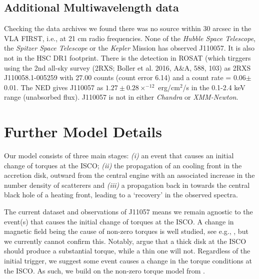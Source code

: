 \documentclass[11pt,a4paper]{article}
\begin{document}
\subsection*{Additional Multiwavelength data}
Checking the data archives we found there was no source within 30
arcsec in the VLA FIRST, i.e., at 21 cm radio frequencies.  None of
the {\it Hubble Space Telescope}, the {\it Spitzer Space Telescope} or
the {\it Kepler} Mission has observed J110057.  It is also not in the
HSC DR1 footprint.  There is the detection in ROSAT (which tirggers  using the 2nd
all-sky survey (2RXS; Boller et al. 2016, A\&A, 588, 103) as 2RXS
J110058.1-005259 with 27.00 counts (count error 6.14) and a count rate
= 0.06$\pm$0.01. The NED gives J110057 as $1.27\pm0.28 \times^{-12}$
erg/cm$^{2}$/s in the 0.1-2.4 keV range (unabsorbed flux). J110057 is
not in either {\it Chandra} or {\it XMM-Newton}.



\section*{Further Model Details}

Our model consists of three main stages: {\it (i)} an event that causes
an initial change of torques at the ISCO; {\it (ii)} the propagation
of an cooling front in the accretion disk, outward from the central
engine with an associated increase in the number density of scatterers
and {\it (iii)} a propagation back in towards the central black hole of a
heating front, leading to a `recovery' in the observed spectra.

The current dataset and observations of J11057 means we remain agnostic to
the event(s) that causes the initial change of torques at the
ISCO.  A change in magnetic field being the cause of non-zero torques
is well studied, see e.g., \citet{Krolik1999, Gammie1999,
Agol_Krolik2000, Reynolds_Armitage2001}, but we currently 
cannot confirm this. Notably,
\citet{Afshordi_Paczynski2003} argue that a thick disk at the ISCO
should produce a substantial torque, while a thin one will not.
Regardless of the initial trigger, we suggest some event causes 
a change in the torque conditions at the ISCO. As such, we build 
on the non-zero torque model from \citet{Zimmerman2005}. 
\end{document}
